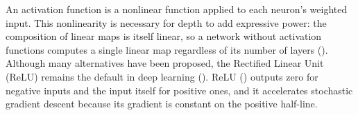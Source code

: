 \documentclass[12pt]{article}
\begin{document}


An activation function is a nonlinear function applied to each neuron's weighted input. 
This nonlinearity is necessary for depth to add expressive power: the composition of linear maps is itself linear, 
so a network without activation functions computes a single linear map regardless of its number of layers (\cite{dubey_activation_2022}).
Although many alternatives have been proposed, the Rectified Linear Unit (ReLU) remains the default in deep learning (\cite{ramachandran_searching_2017}).
ReLU (\cite{nair_rectified_2010}) outputs zero for negative inputs and the input itself for positive ones, and it accelerates stochastic gradient descent because its gradient is constant on the positive half-line.
\end{document}
